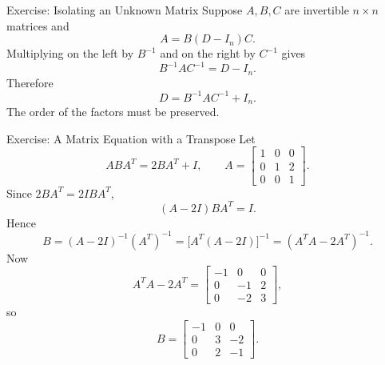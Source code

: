 \begin{frame}{Exercise: Isolating an Unknown Matrix}
Suppose $A,B,C$ are invertible $n\times n$ matrices and
\[
A=B(D-I_n)C.
\]
Multiplying on the left by $B^{-1}$ and on the right by $C^{-1}$ gives
\[
B^{-1}AC^{-1}=D-I_n.
\]
Therefore
\[
\boxed{D=B^{-1}AC^{-1}+I_n}.
\]
The order of the factors must be preserved.
\end{frame}

\begin{frame}[shrink=9]{Exercise: A Matrix Equation with a Transpose}
Let
\[
ABA^T=2BA^T+I,\qquad
A=\begin{bmatrix}1&0&0\\0&1&2\\0&0&1\end{bmatrix}.
\]
Since $2BA^T=2IBA^T$,
\[
(A-2I)BA^T=I.
\]
Hence
\[
B=(A-2I)^{-1}(A^T)^{-1}
=\bigl[A^T(A-2I)\bigr]^{-1}
=(A^TA-2A^T)^{-1}.
\]
Now
\[
A^TA-2A^T=
\begin{bmatrix}-1&0&0\\0&-1&2\\0&-2&3\end{bmatrix},
\]
so
\[
\boxed{B=\begin{bmatrix}-1&0&0\\0&3&-2\\0&2&-1\end{bmatrix}}.
\]
\end{frame}
